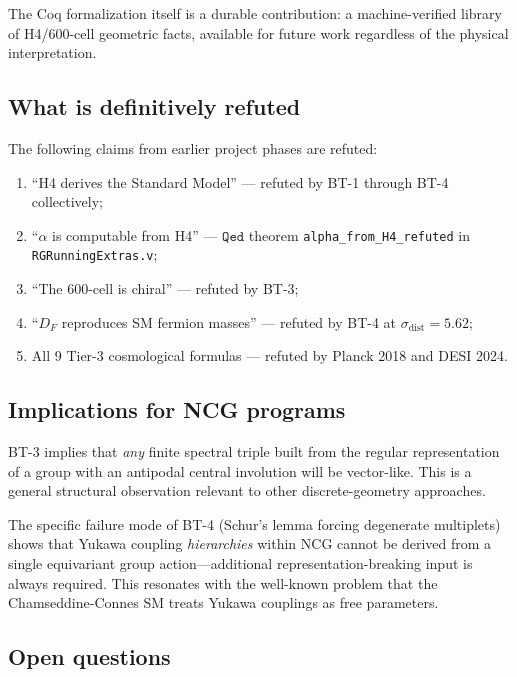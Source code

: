 \documentclass[12pt,a4paper]{article}
\newcommand{\Qed}{\texttt{Qed}}
\newcommand{\sigdist}{\sigma_{\mathrm{dist}}}
\begin{document}
The Coq formalization itself is a durable contribution: a machine-verified library of H4/600-cell
geometric facts, available for future work regardless of the physical interpretation.

\subsection{What is definitively refuted}

The following claims from earlier project phases are refuted:
\begin{enumerate}
  \item ``H4 derives the Standard Model'' --- refuted by BT-1 through BT-4 collectively;
  \item ``\(\alpha\) is computable from H4'' --- \(\Qed\) theorem \texttt{alpha\_from\_H4\_refuted}
    in \texttt{RGRunningExtras.v};
  \item ``The 600-cell is chiral'' --- refuted by BT-3;
  \item ``\(D_F\) reproduces SM fermion masses'' --- refuted by BT-4 at \(\sigdist = 5.62\);
  \item All 9 Tier-3 cosmological formulas --- refuted by Planck 2018 and DESI 2024.
\end{enumerate}

\subsection{Implications for NCG programs}

BT-3 implies that \emph{any} finite spectral triple built from the regular representation
of a group with an antipodal central involution will be vector-like. This is a general
structural observation relevant to other discrete-geometry approaches.

The specific failure mode of BT-4 (Schur's lemma forcing degenerate multiplets) shows
that Yukawa coupling \emph{hierarchies} within NCG cannot be derived from a single equivariant
group action---additional representation-breaking input is always required. This resonates
with the well-known problem that the Chamseddine-Connes SM treats Yukawa couplings as free
parameters.

\subsection{Open questions}
\end{document}
